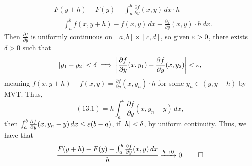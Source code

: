\begin{align*}
    & F(y + h) - F(y) - \int_a^b \frac{\partial f}{\partial y}(x, y) \, dx \cdot h \\
    &= \int_a^b f(x, y + h) - f(x, y) \, dx - \frac{\partial f}{\partial y}(x, y) \cdot h \, dx. \tag{13.1}
\end{align*}
Then $\frac{\partial f}{\partial y}$ is uniformly continuous on $[a, b] \times [c, d]$, so given $\varepsilon > 0$, there exists $\delta > 0$ such that
\[ \left\lvert y_1 - y_2 \right\rvert < \delta \implies \left\lvert \frac{\partial f}{\partial y} (x, y_1) - \frac{\partial f}{\partial y} (x, y_2) \right\rvert < \varepsilon, \]
meaning $f(x, y + h) - f(x, y) = \frac{\partial f}{\partial y} (x, y_n) \cdot h$ for some $y_n \in (y, y + h)$ by MVT. Thus,
\[ (13.1) = h \int_a^b \frac{\partial f}{\partial y} (x, y_n - y) \, dx, \]
then $\int_a^b \frac{\partial f}{\partial y} (x, y_n - y) \, dx \leq \varepsilon (b - a)$, if $\left\lvert h \right\rvert < \delta$, by uniform continuity. Thus, we have that
\[ \frac{F(y + h) - F(y) - \int_a^b \frac{\partial f}{\partial y}(x, y) \, dx}{h} \xrightarrow[]{h \to 0} 0. \qed \]